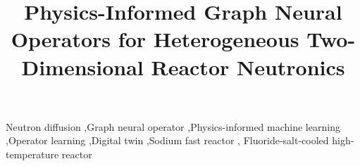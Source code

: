 \documentclass[preprint,12pt]{elsarticle}
\begin{document}
\begin{frontmatter}

\title{Physics-Informed Graph Neural Operators for Heterogeneous Two-Dimensional
Reactor Neutronics}

%
%

\begin{abstract}
\end{abstract}

\begin{keyword}
Neutron diffusion \sep Graph neural operator \sep Physics-informed machine
learning \sep Operator learning \sep Digital twin \sep Sodium fast reactor \sep
Fluoride-salt-cooled high-temperature reactor
\end{keyword}

\end{frontmatter}

\end{document}
